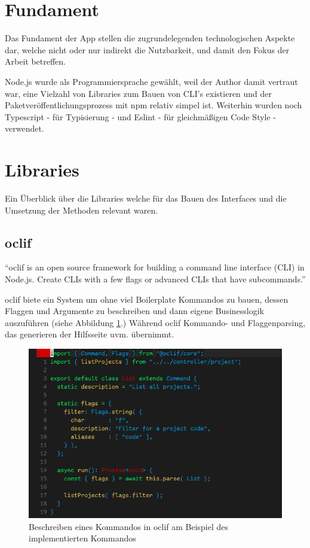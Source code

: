 \documentclass[oneside,bibliography=totocnumbered,BCOR=5mm]{scrbook}
\begin{document}
\section{Fundament}

Das Fundament der App stellen die zugrundelegenden technologischen Aspekte dar,
welche nicht oder nur indirekt die Nutzbarkeit, und damit den Fokus der Arbeit
betreffen.

Node.js wurde als Programmiersprache gewählt, weil der Author damit vertraut
war, eine Vielzahl von Libraries zum Bauen von CLI's existieren und der
Paketveröffentlichungsprozess mit npm relativ simpel ist. Weiterhin wurden noch
Typescript - für Typisierung - und Eslint - für gleichmäßigen Code Style -
verwendet.

\section{Libraries}

Ein Überblick über die Libraries welche für das Bauen des Interfaces und die
Umsetzung der Methoden relevant waren.

\subsection{oclif}

``oclif is an open source framework for building a command line interface
(CLI) in Node.js. Create CLIs with a few flags or advanced CLIs that have
subcommands.'' \parencite{oclif}

oclif biete ein System um ohne viel Boilerplate Kommandos zu bauen, dessen
Flaggen und Argumente zu beschreiben und dann eigene Businesslogik auszuführen
(siehe Abbildung \ref{fig:oclif-list}.) Während oclif Kommando- und
Flaggenparsing, das generieren der Hilfsseite uvm. übernimmt.

\begin{figure} %
  \centering
  \includegraphics[scale=0.5]{oclif-list.png}
  \caption{Beschreiben eines Kommandos in oclif am Beispiel des implementierten  Kommandos}
  \label{fig:oclif-list}
\end{figure}
\end{document}
